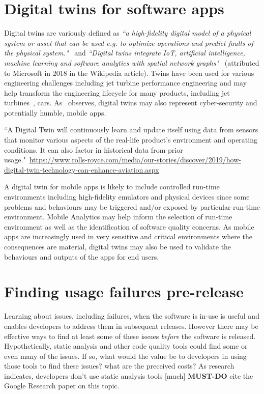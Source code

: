 \section{Digital twins for software apps}
Digital twins are variously defined as \emph{``a high-fidelity digital model of a physical system or asset that can be used e.g. to optimize operations and predict faults of the physical system."}~\cite{pokhrel2020_digitaltwin_for_cybersecurity} and \emph{``Digital twins integrate IoT, artificial intelligence, machine learning and software analytics with spatial network graphs"}~\cite{wikipedia__digital_twin} (attributed to Microsoft in 2018 in the Wikipedia article). Twins have been used for various engineering challenges including jet turbine performance engineering and may help transform the engineering lifecycle for many products, including jet turbines~\cite{read2018_digital_takeover_avionics}, cars. As~\cite{pokhrel2020_digitaltwin_for_cybersecurity} observes, digital twins may also represent cyber-security and potentially humble, mobile apps.

``A Digital Twin will continuously learn and update itself using data from sensors that monitor various aspects of the real-life product’s environment and operating conditions. It can also factor in historical data from prior usage."~\url{https://www.rolls-royce.com/media/our-stories/discover/2019/how-digital-twin-technology-can-enhance-aviation.aspx}

A digital twin for mobile apps is likely to include controlled run-time environments including high-fidelity emulators and physical devices since some problems and behaviours may be triggered and/or exposed by particular run-time environment. Mobile Analytics may help inform the selection of run-time environment as well as the identification of software quality concerns. As mobile apps are increasingly used in very sensitive and critical environments where the consequences are material, digital twins may also be used to validate the behaviours and outputs of the apps for end users.



\section{Finding usage failures pre-release}
Learning about issues, including failures, when the software is in-use is useful and enables developers to address them in subsequent releases. However there may be effective ways to find at least some of these issues \textit{before} the software is released. Hypothetically, static analysis and other code quality tools could find some or even many of the issues. If so, what would the value be to developers in using those tools to find these issues? what are the preceived costs? As research indicates, developers don't use static analysis tools [much] 
\textbf{MUST-DO} cite the Google Research paper on this topic.

